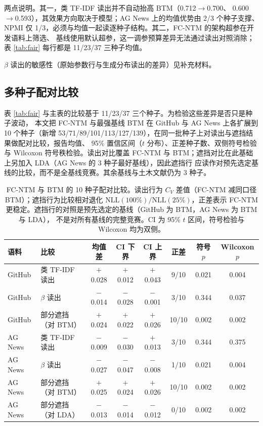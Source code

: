 \documentclass[11pt]{ctexart}
\newcommand{\fcntm}{FC-NTM}
\begin{document}
两点说明。其一，类 TF-IDF 读出并不自动抬高 BTM（0.712$\rightarrow$0.700、
0.600$\rightarrow$0.593），其效果方向取决于模型；AG News 上的均值优势由 2/3 个种子支撑、
NPMI 仅 1/3，必须与均值一起读逐种子结构。其二，\fcntm{} 的架构超参在开发语料上筛选、
基线使用默认超参，这一调参预算差异无法通过读出对照消除；表 \ref{tab:fair} 每行都是
11/23/37 三种子均值。

$\beta$ 读出的敏感性（原始参数行与生成分布读出的差异）见补充材料。

\subsection{多种子配对比较}
\label{sec:seed-extension}

表 \ref{tab:fair} 与主表的比较基于 11/23/37 三个种子。为检验这些差异是否只是种子波动，
本文把 \fcntm{} 与最强基线 BTM 在 GitHub 与 AG News 上各扩展到 10 个种子（新增
53/71/89/101/113/127/139），在同一批种子上对读出与遮挡结果做配对比较，报告均值、
95\% 置信区间（$t$ 分布）、正差种子数、双侧符号检验与 Wilcoxon 符号秩检验。读出对比覆盖
\fcntm{} 与 BTM；遮挡对比在此基础上另加入 LDA（AG News 的 3 种子最好基线），因此遮挡行
应读作对预先选定基线的比较，而不是全基线竞赛。其余基线与土木文献仍为 3 种子。

\begin{table}[t]
\centering
\caption{\fcntm{} 与 BTM 的 10 种子配对比较。读出行为 $C_V$ 差值（\fcntm{} 减同口径
BTM）；遮挡行为比较相对退化 $\mathrm{NLL}(100\%)/\mathrm{NLL}(25\%)$，正差表示 \fcntm{}
更稳定。遮挡行的对照是预先选定的基线（GitHub 为 BTM，AG News 为 BTM 与 LDA），
不是对所有基线的完整竞赛。CI 为 95\% $t$ 区间，符号检验与 Wilcoxon 均为双侧。}
\label{tab:seed-paired}
\small
\setlength{\tabcolsep}{4pt}
\begin{tabular}{@{}llcccccc@{}}
\toprule
语料 & 比较 & 均值差 & CI 下界 & CI 上界 & 正差 & 符号 $p$ & Wilcoxon $p$ \\
\midrule
GitHub & 类 TF-IDF 读出 & $+$0.028 & $+$0.012 & $+$0.043 & 9/10 & 0.021 & 0.004 \\
GitHub & $\beta$ 读出 & $-$0.014 & $-$0.028 & $-$0.001 & 3/10 & 0.344 & 0.037 \\
GitHub & 部分遮挡（对 BTM） & $+$0.024 & $+$0.022 & $+$0.026 & 10/10 & 0.002 & 0.002 \\
\midrule
AG News & 类 TF-IDF 读出 & $-$0.009 & $-$0.030 & $+$0.013 & 3/10 & 0.344 & 0.375 \\
AG News & $\beta$ 读出 & $-$0.027 & $-$0.047 & $-$0.008 & 1/10 & 0.021 & 0.004 \\
AG News & 部分遮挡（对 BTM） & $+$0.025 & $+$0.024 & $+$0.026 & 10/10 & 0.002 & 0.002 \\
AG News & 部分遮挡（对 LDA） & $-$0.013 & $-$0.014 & $-$0.012 & 0/10 & 0.002 & 0.002 \\
\bottomrule
\end{tabular}
\end{table}
\end{document}
